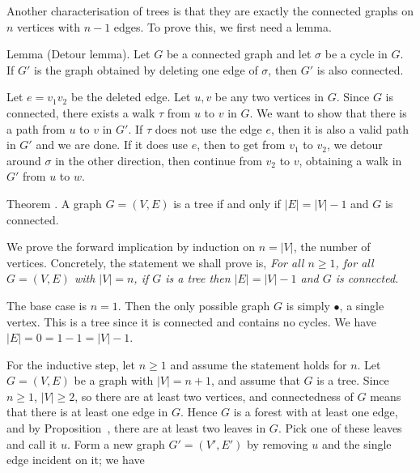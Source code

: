 \bye

Another characterisation of trees is that they are exactly the connected graphs on $n$ vertices
with $n-1$ edges. To prove this, we first need a lemma.

\parenproclaim Lemma {\advthm} (Detour lemma). Let $G$ be a connected graph and let
$\sigma$ be a cycle in $G$. If $G'$ is the graph obtained by deleting one edge
of $\sigma$, then $G'$ is also connected.

\proof Let $e = v_1v_2$ be the deleted edge. Let $u,v$ be any two vertices in $G$.
Since $G$ is connected, there exists a walk $\tau$ from $u$ to $v$ in $G$.
We want to show that there is a path from $u$ to $v$ in $G'$. If $\tau$ does not use
the edge $e$, then it is also a valid path in $G'$ and we are done. If it does use $e$,
then to get from $v_1$ to $v_2$,
we detour around $\sigma$ in the other direction, then continue from $v_2$ to $v$, obtaining
a walk in $G'$ from $u$ to $w$.\slug

\proclaim{} Theorem \advthm. A graph $G = (V,E)$ is a tree if and only if
$|E| = |V|-1$ and $G$ is connected.

\proof We prove the forward implication by induction on $n=|V|$, the number of vertices.
Concretely, the statement we shall prove is, {\sl For all $n\ge 1$, for all $G=(V,E)$ with
$|V| = n$, if $G$ is a tree then $|E| = |V|-1$ and $G$ is connected.}

The base case is $n=1$. Then the only possible graph $G$ is simply $\bullet$, a single vertex.
This is a tree since it is connected and contains no cycles. We have $|E| = 0 = 1-1 = |V|-1$.

For the inductive step, let $n\ge 1$ and assume the statement holds for $n$. Let $G = (V,E)$
be a graph with $|V| = n+1$, and assume that $G$ is a tree. Since $n\ge 1$,
$|V| \ge 2$, so there are at least two vertices, and connectedness of $G$ means that there
is at least one edge in $G$. Hence $G$ is a forest with at least one edge, and by
Proposition~{\proptwoleaves}, there are at least two leaves in $G$. Pick one of these leaves
and call it $u$. Form a new graph $G' = (V', E')$ by removing $u$ and the single edge
incident on it; we have


\bye
